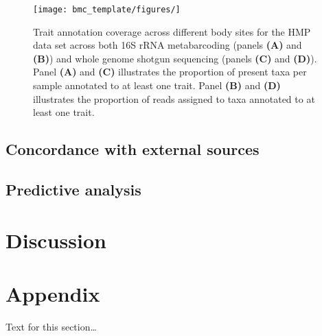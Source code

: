 \documentclass{bmcart}
\begin{document}
\begin{figure}[!h]
\texttt{[image: bmc\_template/figures/]}
\caption{Trait annotation coverage across different body sites for the HMP data set across both 16S rRNA metabarcoding (panels \textbf{(A)} and \textbf{(B)}) and whole genome shotgun sequencing (panels \textbf{(C)} and \textbf{(D)}). Panel \textbf{(A)} and \textbf{(C)} illustrates the proportion of present taxa per sample annotated to at least one trait. Panel \textbf{(B)} and \textbf{(D)} illustrates the proportion of reads assigned to taxa annotated to at least one trait.}
\label{fig:1}
\end{figure}


\subsection*{Concordance with external sources}  

\subsection*{Predictive analysis}

\section*{Discussion}


\section*{Appendix}
Text for this section\ldots

\end{document}
